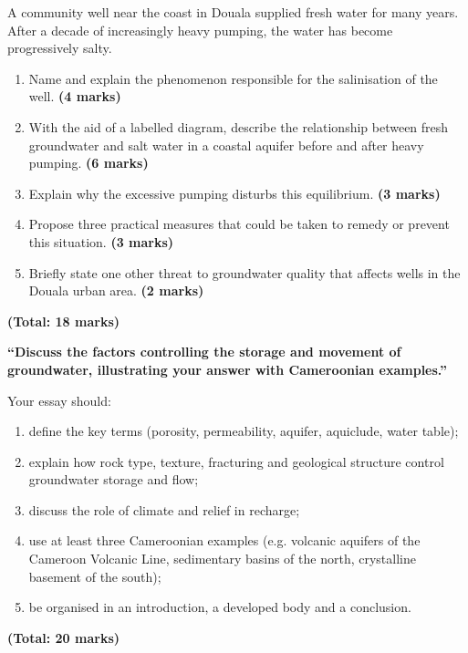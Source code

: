 \documentclass[11pt]{article}
\begin{document}
\begin{exercice}
A community well near the coast in Douala supplied fresh water for many years. After a decade of increasingly heavy pumping, the water has become progressively salty.

\begin{enumerate}
\item Name and explain the phenomenon responsible for the salinisation of the well. \textbf{(4 marks)}
\item With the aid of a labelled diagram, describe the relationship between fresh groundwater and salt water in a coastal aquifer before and after heavy pumping. \textbf{(6 marks)}
\item Explain why the excessive pumping disturbs this equilibrium. \textbf{(3 marks)}
\item Propose three practical measures that could be taken to remedy or prevent this situation. \textbf{(3 marks)}
\item Briefly state one other threat to groundwater quality that affects wells in the Douala urban area. \textbf{(2 marks)}
\end{enumerate}
\textbf{(Total: 18 marks)}
\end{exercice}

\begin{exercice}
\textbf{``Discuss the factors controlling the storage and movement of groundwater, illustrating your answer with Cameroonian examples.''}

Your essay should:
\begin{enumerate}
\item define the key terms (porosity, permeability, aquifer, aquiclude, water table);
\item explain how rock type, texture, fracturing and geological structure control groundwater storage and flow;
\item discuss the role of climate and relief in recharge;
\item use at least three Cameroonian examples (e.g. volcanic aquifers of the Cameroon Volcanic Line, sedimentary basins of the north, crystalline basement of the south);
\item be organised in an introduction, a developed body and a conclusion.
\end{enumerate}
\textbf{(Total: 20 marks)}
\end{exercice}

\newpage
\end{document}

